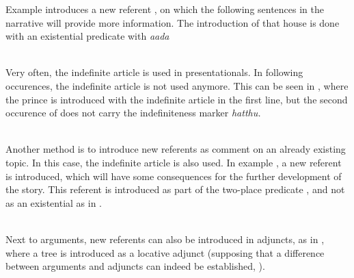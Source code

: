 Example  introduces a new referent , on which the following sentences in the narrative will provide more information. The introduction of that house is done with an existential predicate with \em aada\em

\\

Very often, the indefinite article is used in presentationals. In following occurences, the indefinite article is not used anymore. This can be seen  in , where the prince is introduced with the indefinite article in the first line, but the second occurence of  does not carry the indefiniteness marker \em hatthu\em.

 
 \\



Another method is to introduce new referents as comment on an already existing topic. In this case, the indefinite article is also used. In example , a new referent  is introduced, which will have some consequences for the further development of the story. This referent is introduced as part of the two-place predicate , and not as an existential as in .

  
 \\
Next to arguments, new referents can also be introduced in adjuncts, as in , where a tree is introduced as a locative adjunct (supposing that a difference between arguments and adjuncts can indeed be established,  ).

